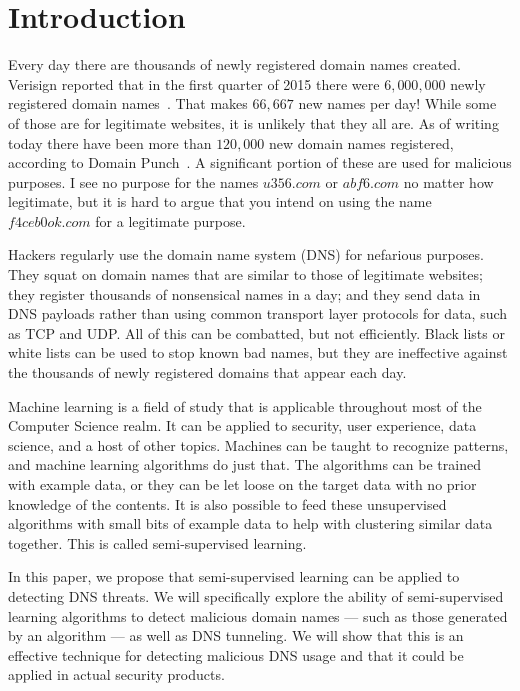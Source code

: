 \section{Introduction}

Every day there are thousands of newly registered domain names created.
Verisign reported that in the first quarter of 2015 there were $6,000,000$ newly registered domain names~\cite{verisign}.
That makes $66,667$ new names per day!
While some of those are for legitimate websites, it is unlikely that they all are.
As of writing today there have been more than $120,000$ new domain names registered, according to Domain Punch~\cite{domainpunch}.
A significant portion of these are used for malicious purposes.
I see no purpose for the names $u356.com$ or $abf6.com$ no matter how legitimate, but it is hard to
argue that you intend on using the name $f4ceb0ok.com$ for a legitimate purpose.

Hackers regularly use the domain name system (DNS) for nefarious purposes.
They squat on domain names that are similar to those of legitimate websites; they register thousands
of nonsensical names in a day; and they send data in DNS payloads rather than using common transport
layer protocols for data, such as TCP and UDP\@.
All of this can be combatted, but not efficiently.
Black lists or white lists can be used to stop known bad names, but they are ineffective against
the thousands of newly registered domains that appear each day.

Machine learning is a field of study that is applicable throughout most of the Computer Science realm.
It can be applied to security, user experience, data science, and a host of other topics.
Machines can be taught to recognize patterns, and machine learning algorithms do just that.
The algorithms can be trained with example data, or they can be let loose on the target data with
no prior knowledge of the contents.
It is also possible to feed these unsupervised algorithms with small bits of example data to help
with clustering similar data together.
This is called semi-supervised learning.

In this paper, we propose that semi-supervised learning can be applied to detecting DNS threats.
We will specifically explore the ability of semi-supervised learning algorithms to detect malicious
domain names --- such as those generated by an algorithm --- as well as DNS tunneling.
We will show that this is an effective technique for detecting malicious DNS usage and that it could
be applied in actual security products.
